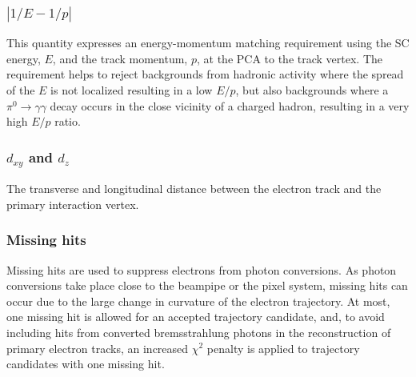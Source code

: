 \subsubsection*{$|1/E - 1/p|$}
\noindent\justify  
This quantity expresses an energy-momentum matching requirement using the SC energy, $E$, and the track momentum, $p$, at the PCA to the track vertex. 
The requirement helps to reject backgrounds from hadronic activity where the spread of the $E$ is not localized resulting in a low $E/p$, but also backgrounds where a $\pi^{0}\rightarrow\gamma\gamma$ decay occurs in the close vicinity of a charged hadron, resulting in a very high $E/p$ ratio.
\subsubsection*{$d_{xy}$ and $d_{z}$}
\noindent\justify  
The transverse and longitudinal distance between the electron track and the primary interaction vertex.
\subsubsection*{Missing hits}
\noindent\justify  
Missing hits are used to suppress electrons from photon conversions. 
As photon conversions take place close to the beampipe or the pixel system, missing hits can occur due to the large change in curvature of the electron trajectory. 
At most, one missing hit is allowed for an accepted trajectory candidate, and, to avoid including hits from converted bremsstrahlung photons in the reconstruction of primary electron tracks, an increased $\chi^{2}$ penalty is applied to trajectory candidates with one missing hit.
